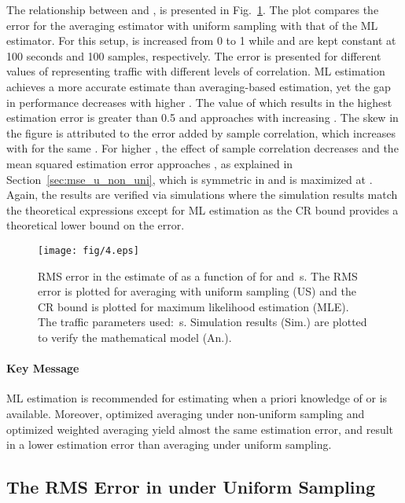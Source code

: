 \documentclass[11pt,draftclsnofoot,journal,onecolumn]{IEEEtran}
\begin{document}
The relationship between  and , is presented in Fig.~\ref{fig:mse_u_u}. The plot compares the error for the averaging estimator with uniform sampling with that of the ML estimator. For this setup,  is increased from 0 to 1 while  and  are kept constant at 100 seconds and 100 samples, respectively. The error is presented for different values of  representing traffic with different levels of correlation. ML estimation achieves a more accurate estimate than averaging-based estimation, yet the gap in performance decreases with higher . The value of  which results in the highest estimation error is greater than 0.5 and approaches  with increasing . The skew in the figure is attributed to the error added by sample correlation, which increases with  for the same . For higher , the effect of sample correlation decreases and the mean squared estimation error approaches , as explained in Section~\ref{sec:mse_u_non_uni}, which is symmetric in  and is maximized at . Again, the results are verified via simulations where the simulation results match the theoretical expressions except for ML estimation as the CR bound provides a theoretical lower bound on the error.
\begin{figure}
\centering
\texttt{[image: fig/4.eps]}
\caption{RMS error in the estimate of  as a function of  for  and \,s. The RMS error is plotted for averaging with uniform sampling (US) and the CR bound is plotted for maximum likelihood estimation (MLE). The traffic parameters used: \,s. Simulation results (Sim.) are plotted to verify the mathematical model (An.).}
\label{fig:mse_u_u}
\end{figure}

\paragraph*{Key Message}

ML estimation is recommended for estimating  when a priori knowledge of  or  is available. Moreover, optimized averaging under non-uniform sampling and optimized weighted averaging yield almost the same estimation error, and result in a lower estimation error than averaging under uniform sampling.

\subsection{The RMS Error in  under Uniform Sampling}
\label{sec:num_MSE_lf}
\end{document}
